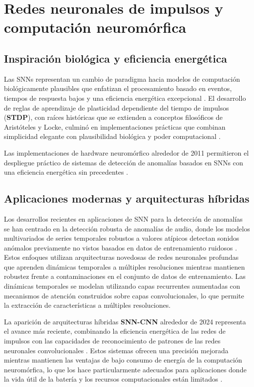 \section{Redes neuronales de impulsos y computación neuromórfica}
\subsection{Inspiración biológica y eficiencia energética}

Las SNNs representan un cambio de paradigma hacia modelos de computación biológicamente plausibles que enfatizan el procesamiento basado en eventos, tiempos de respuesta bajos y una eficiencia energética excepcional \cite{maass_networks_1997}. El desarrollo de reglas de aprendizaje de plasticidad dependiente del tiempo de impulsos (\textbf{STDP}), con raíces históricas que se extienden a conceptos filosóficos de Aristóteles y Locke, culminó en implementaciones prácticas que combinan simplicidad elegante con plausibilidad biológica y poder computacional \cite{markram_history_2011}.

Las implementaciones de hardware neuromórfico alrededor de 2011 permitieron el despliegue práctico de sistemas de detección de anomalías basados en SNNs con una eficiencia energética sin precedentes \cite{indiveri_neuromorphic_2011}.

\subsection{Aplicaciones modernas y arquitecturas híbridas}

Los desarrollos recientes en aplicaciones de SNN para la detección de anomalías se han centrado en la detección robusta de anomalías de audio, donde los modelos multivariados de series temporales robustos a valores atípicos detectan sonidos anómalos previamente no vistos basados en datos de entrenamiento ruidosos \cite{lee_robust_2022}. Estos enfoques utilizan arquitecturas novedosas de redes neuronales profundas que aprenden dinámicas temporales a múltiples resoluciones mientras mantienen robustez frente a contaminaciones en el conjunto de datos de entrenamiento. Las dinámicas temporales se modelan utilizando capas recurrentes aumentadas con mecanismos de atención construidos sobre capas convolucionales, lo que permite la extracción de características a múltiples resoluciones.

La aparición de arquitecturas híbridas \textbf{SNN-CNN} alrededor de 2024 representa el avance más reciente, combinando la eficiencia energética de las redes de impulsos con las capacidades de reconocimiento de patrones de las redes neuronales convolucionales \cite{sanaullah_hybrid_2024}. Estos sistemas ofrecen una precisión mejorada mientras mantienen las ventajas de bajo consumo de energía de la computación neuromórfica, lo que los hace particularmente adecuados para aplicaciones donde la vida útil de la batería y los recursos computacionales están limitados \cite{liu_sparsity-aware_2024}.